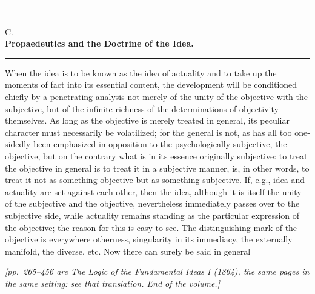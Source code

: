 \documentclass[12pt,a4paper,openany]{book}
\newcommand{\editorial}[1]{\par\medskip\begin{center}\small\textit{[#1]}\end{center}\medskip\par}
\begin{document}
\begin{center}\rule{4em}{0.4pt}\\[0.5em]
C.\\[0.3em]
\textbf{Propaedeutics and the Doctrine of the Idea.}\\[0.5em]
\rule{4em}{0.4pt}\end{center}

When the idea is to be known as the idea of actuality and to take up the moments of fact into its essential content,
the development will be conditioned chiefly by a penetrating analysis not merely of the unity of the objective with
the subjective, but of the infinite richness of the determinations of objectivity themselves. As long as the
objective is merely treated in general, its peculiar character must necessarily be volatilized; for the general is
not, as has all too one-sidedly been emphasized in opposition to the psychologically subjective, the objective, but on
the contrary what is in its essence originally subjective: to treat the objective in general is to treat it in a
subjective manner, is, in other words, to treat it not as something objective but as something subjective. If, e.g.,
idea and actuality are set against each other, then the idea, although it is itself the unity of the subjective and
the objective, nevertheless immediately passes over to the subjective side, while actuality remains standing as the
particular expression of the objective; the reason for this is easy to see. The distinguishing mark of the objective
is everywhere otherness, singularity in its immediacy, the externally manifold, the diverse, etc. Now there can surely
be said in general

\editorial{pp.~265--456 are \emph{The Logic of the Fundamental Ideas I} (1864), the same pages in the same setting:
see that translation.  End of the volume.}
\end{document}
